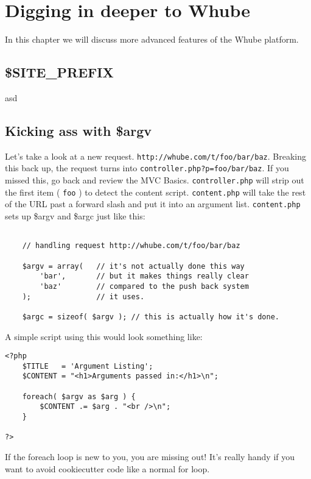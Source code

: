 \chapter{Digging in deeper to Whube}
In this chapter we will discuss more advanced features of the Whube platform.
\section{\$SITE\_PREFIX}
asd
\section{Kicking ass with \$argv}
Let's take a look at a new request. \texttt{http://whube.com/t/foo/bar/baz}.
Breaking this back up, the request turns into \texttt{controller.php?p=foo/bar/baz}.
If you missed this, go back and review the MVC Basics. \texttt{controller.php} will
strip out the first item ( \texttt{foo} ) to detect the content script. \texttt{content.php}
will take the rest of the URL past a forward slash and put it into an argument list.
\texttt{content.php} sets up \$argv and \$argc just like this:
\begin{verbatim}

    // handling request http://whube.com/t/foo/bar/baz

    $argv = array(   // it's not actually done this way
        'bar',       // but it makes things really clear
        'baz'        // compared to the push back system
    );               // it uses.

    $argc = sizeof( $argv ); // this is actually how it's done.

\end{verbatim}
A simple script using this would look something like:
\begin{verbatim}
<?php
    $TITLE   = 'Argument Listing';
    $CONTENT = "<h1>Arguments passed in:</h1>\n";

    foreach( $argv as $arg ) {
        $CONTENT .= $arg . "<br />\n";
    }

?>
\end{verbatim}
If the foreach loop is new to you, you are missing out! It's really
handy if you want to avoid cookiecutter code like a normal for loop.
